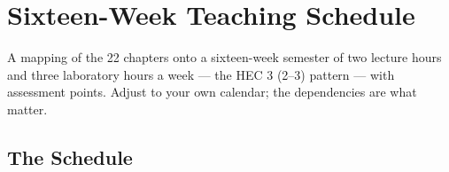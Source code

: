 \chapter{Sixteen-Week Teaching Schedule}\label{app:schedule}
\normalfigures

A mapping of the 22 chapters onto a sixteen-week semester of two lecture hours and
three laboratory hours a week --- the HEC 3 (2--3) pattern --- with assessment points.
Adjust to your own calendar; the dependencies are what matter.

\section{The Schedule}

